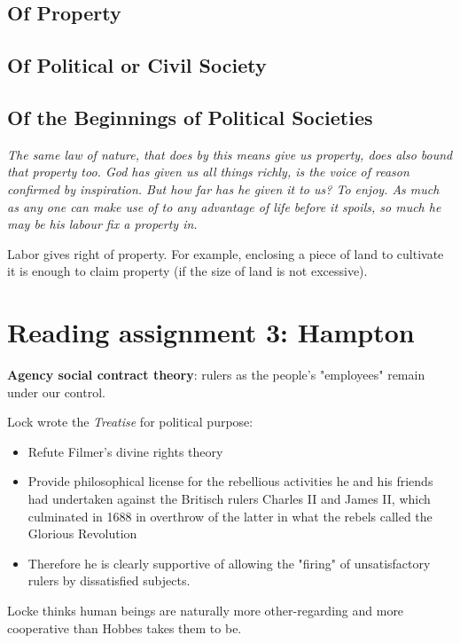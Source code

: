 \subsection{Of Property}

\subsection{Of Political or Civil Society}

\subsection{Of the Beginnings of Political Societies}

\textit{
The same law of nature, that does by this means give us property, does also
bound that property too. God has given us all things richly, is the voice of
reason confirmed by inspiration. But how far has he given it to us? To enjoy.
As much as any one can make use of to any advantage of life before it spoils,
so much he may be his labour fix a property in.
}

Labor gives right of property. For example, enclosing a piece of land to
cultivate it is enough to claim property (if the size of land is not
excessive).

\section{Reading assignment 3: Hampton}

\textbf{Agency social contract theory}: rulers as the people's "employees"
remain under our control.

Lock wrote the \textit{Treatise} for political purpose:
\begin{itemize}
	\item Refute Filmer's divine rights theory
	\item Provide philosophical license for the rebellious activities he
	and his friends had undertaken against the Britisch rulers Charles II
	and James II, which culminated in 1688 in overthrow of the latter in
	what the rebels called the Glorious Revolution
	\item Therefore he is clearly supportive of allowing the "firing" of
	unsatisfactory rulers by dissatisfied subjects.
\end{itemize}

Locke thinks human beings are naturally more other-regarding and more
cooperative than Hobbes takes them to be.

